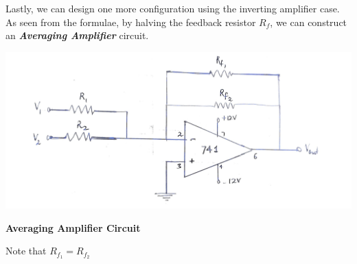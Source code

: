 Lastly, we can design one more configuration using the inverting amplifier case. As seen from the formulae, by halving the feedback resistor $R_f$, we can construct an \textbf{\emph{Averaging Amplifier}} circuit.
\begin{center}
    \includegraphics[scale = 0.2]{OPAMP Config/averaging.jpg}
\end{center}
\begin{center}
    \textbf{Averaging Amplifier Circuit}
\end{center}
\noindent Note that $R_{f_1} = R_{f_2}$
